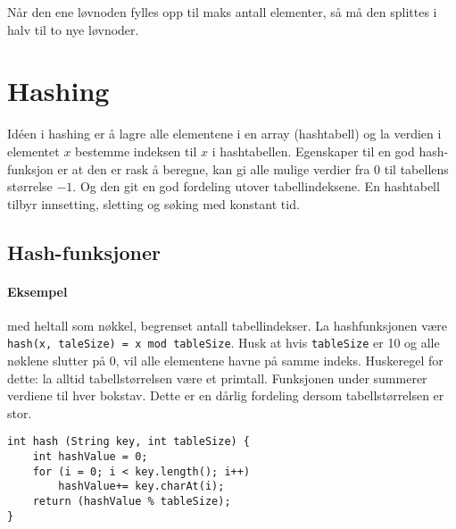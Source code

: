 \documentclass[11pt,a4paper]{article}
\theoremstyle{def}
\begin{document}
\begin{minipage}{0.5\textwidth}
\end{minipage}

Når den ene løvnoden fylles opp til maks antall elementer, så må den splittes i halv til to nye løvnoder.

\section{Hashing}
Idéen i hashing er å lagre alle elementene i en array (hashtabell) og la verdien i elementet $x$ bestemme indeksen til $x$ i hashtabellen. Egenskaper til en god hash-funksjon er at den er rask å beregne, kan gi alle mulige verdier fra 0 til tabellens størrelse $-1$. Og den git en god fordeling utover tabellindeksene. En hashtabell tilbyr innsetting, sletting og søking med konstant tid.

\subsection{Hash-funksjoner}
\paragraph{Eksempel} med heltall som nøkkel, begrenset antall tabellindekser. La hashfunksjonen være \texttt{hash(x, taleSize) = x mod tableSize}. Husk at hvis \texttt{tableSize} er 10 og alle nøklene slutter på 0, vil alle elementene havne på samme indeks. Huskeregel for dette: la alltid tabellstørrelsen være et primtall. Funksjonen under summerer verdiene til hver bokstav. Dette er en dårlig fordeling dersom tabellstørrelsen er stor.
\begin{lstlisting}
int hash (String key, int tableSize) {
	int hashValue = 0;
	for (i = 0; i < key.length(); i++) 
		hashValue+= key.charAt(i);
	return (hashValue % tableSize);
}
\end{lstlisting}
\end{document}
